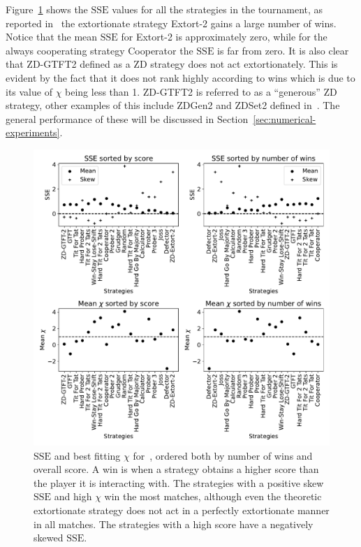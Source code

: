\documentclass[a4paper]{article}
\newcommand{\SSe}{\text{SSE}}
\begin{document}
Figure~\ref{fig:sserror_in_stewart_plotkin} shows the
\(\SSe\) values for all the strategies in the tournament, as
reported in~\cite{Stewart2012} the extortionate strategy Extort-2 gains a large number of
wins. Notice that the mean \(\SSe\) for Extort-2 is approximately zero, while for
the always cooperating strategy Cooperator the \(\SSe\) is far from zero. It is
also clear that ZD-GTFT2 defined as a ZD strategy does not act
extortionately. This is evident by the fact that it does not rank highly according
to wins which is due to its value of \(\chi\) being less than 1.
ZD-GTFT2 is referred to as a ``generous'' ZD strategy, other examples of this
include ZDGen2 and ZDSet2 defined in~\cite{sep-prisoner-dilemma}. The
general performance of these will be discussed in
Section~\ref{sec:numerical-experiments}.

\begin{figure}[!htbp]
    \centering
    \includegraphics[width=.8\textwidth]{./assets/img/sserror_in_stewart_plotkin/main.pdf}
    \caption{\(\SSe\) and best fitting \(\chi\) for~\cite{Stewart2012},
        ordered both by number of wins and overall score.
        A win is when a strategy obtains a higher score than the player it is
        interacting with.
        The strategies with a positive skew
        \(\SSe\) and high \(\chi\) win the most matches, although even the
        theoretic
        extortionate strategy does not act in a perfectly extortionate manner in
        all matches. The strategies with a high score have a negatively skewed
        \(\SSe\).
        }
    \label{fig:sserror_in_stewart_plotkin}
\end{figure}
\end{document}
